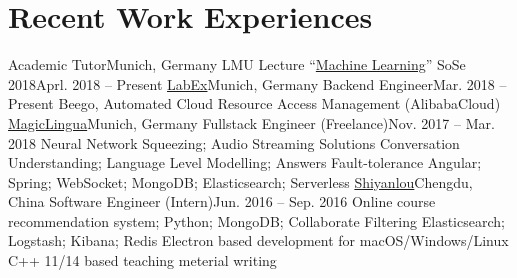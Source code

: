 \section{\textbf{Recent Work Experiences}}
  \resumeSubHeadingListStart
    \resumeSubheading
      {Academic Tutor}{Munich, Germany}
      {LMU Lecture ``\href{http://www.dbs.ifi.lmu.de/cms/studium_lehre/lehre_master/ml18/index.html}{Machine Learning}'' SoSe 2018}{Aprl. 2018 -- Present}
    \resumeSubheading
      {\href{https://labex.io/}{LabEx}}{Munich, Germany}
      {Backend Engineer}{Mar. 2018 -- Present}
      \resumeItemListStart
          {Beego, Automated Cloud Resource Access Management (AlibabaCloud)}
      \resumeItemListEnd
    \resumeSubheading
    {\href{https://magiclingua.com/}{MagicLingua}}{Munich, Germany}
    {Fullstack Engineer (Freelance)}{Nov. 2017 -- Mar. 2018}
    \resumeItemListStart
        {Neural Network Squeezing; Audio Streaming Solutions}
        {Conversation Understanding; Language Level Modelling; Answers Fault-tolerance}
        {Angular; Spring; WebSocket; MongoDB; Elasticsearch; Serverless}
    \resumeItemListEnd
    \resumeSubheading
      {\href{https://shiyanlou.com/}{Shiyanlou}}{Chengdu, China}
      {Software Engineer (Intern)}{Jun. 2016 -- Sep. 2016}
      \resumeItemListStart
          {Online course recommendation system; Python; MongoDB; Collaborate Filtering}
          {Elasticsearch; Logstash; Kibana; Redis}
          {Electron based development for macOS/Windows/Linux}
          {C++ 11/14 based teaching meterial writing}
      \resumeItemListEnd
  \resumeSubHeadingListEnd
